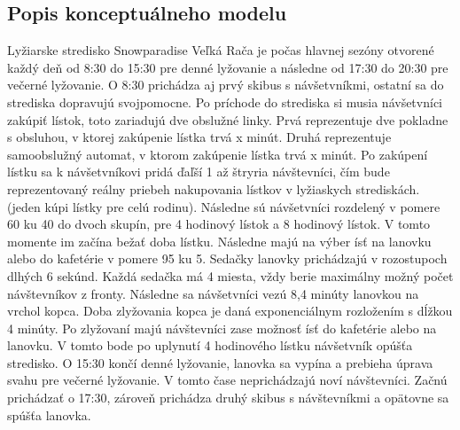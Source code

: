 \subsection{Popis konceptuálneho modelu}
Lyžiarske stredisko Snowparadise Veľká Rača je počas hlavnej sezóny otvorené každý deň od 8:30 do 15:30 pre denné lyžovanie a následne 
od 17:30 do 20:30 pre večerné lyžovanie. O 8:30 prichádza aj prvý skibus s návšetvníkmi, ostatní sa do strediska dopravujú svojpomocne. Po príchode do strediska si musia návšetvníci zakúpiť lístok, toto zariadujú dve obslužné linky. Prvá reprezentuje dve pokladne s obsluhou,
v ktorej zakúpenie lístka trvá x minút. Druhá reprezentuje samoobslužný automat, v ktorom zakúpenie lístka trvá x minút.
Po zakúpení lístku sa k návšetvníkovi pridá ďaľší 1 až štryria návštevníci, čím bude reprezentovaný reálny priebeh nakupovania lístkov v lyžiaskych strediskách.
(jeden kúpi lístky pre celú rodinu). Následne sú návšetvníci rozdelený v pomere 60 ku 40 do dvoch skupín, pre 4 hodinový lístok a 8 hodinový lístok.
V tomto momente im začína bežať doba lístku. Následne majú na výber ísť na lanovku alebo do kafetérie v pomere 95 ku 5. Sedačky lanovky 
prichádzajú v rozostupoch dlhých 6 sekúnd. Každá sedačka má 4 miesta, vždy berie maximálny možný počet návštevníkov z fronty. Následne
sa návšetvníci vezú 8,4 minúty lanovkou na vrchol kopca. Doba zlyžovania kopca je daná exponenciálnym rozložením s dĺžkou 4 minúty.
Po zlyžovaní majú návštevníci zase možnosť ísť do kafetérie alebo na lanovku. V tomto bode po uplynutí 4 hodinového lístku návšetvník opúšťa stredisko.
O 15:30 končí denné lyžovanie, lanovka sa vypína a prebieha úprava svahu pre večerné lyžovanie. V tomto čase neprichádzajú noví návštevníci.
Začnú prichádzať o 17:30, zároveň prichádza druhý skibus s návštevníkmi a opätovne sa spúšťa lanovka. 
